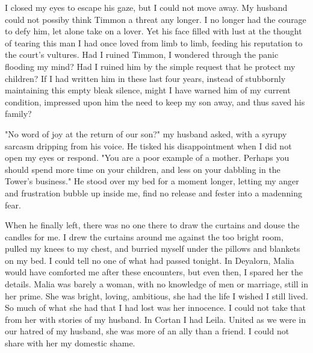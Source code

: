 \documentclass{article}
\begin{document}
I closed my eyes to escape his gaze, but I could not move away. My husband could not possiby think Timmon a threat any longer. I no longer had the courage to defy him, let alone take on a lover. Yet his face filled with lust at the thought of tearing this man I had once loved from limb to limb, feeding his reputation to the court's vultures. Had I ruined Timmon, I wondered through the panic flooding my mind? Had I ruined him by the simple request that he protect my children? If I had written him in these last four years, instead of stubbornly maintaining this empty bleak silence, might I have warned him of my current condition, impressed upon him the need to keep my son away, and thus saved his family?

"No word of joy at the return of our son?" my husband asked, with a syrupy sarcasm dripping from his voice. He tisked his disappointment when I did not open my eyes or respond. "You are a poor example of a mother. Perhaps you should spend more time on your children, and less on your dabbling in the Tower's business." He stood over my bed for a moment longer, letting my anger and frustration bubble up inside me, find no release and fester into a madenning fear.

When he finally left, there was no one there to draw the curtains and douse the candles for me. I drew the curtains around me against the too bright room, pulled my knees to my chest, and burried myself under the pillows and blankets on my bed. I could tell no one of what had passed tonight. In Deyalorn, Malia would have comforted me after these encounters, but even then, I spared her the details. Malia was barely a woman, with no knowledge of men or marriage, still in her prime. She was bright, loving, ambitious, she had the life I wished I still lived. So much of what she had that I had lost was her innocence. I could not take that from her with stories of my husband. In Cortan I had Leila. United as we were in our hatred of my husband, she was more of an ally than a friend. I could not share with her my domestic shame. 

\vspace{.5cm}
\end{document}
